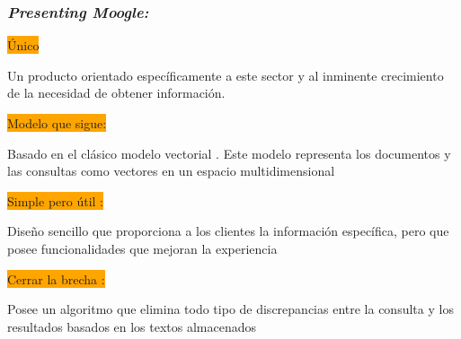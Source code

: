\begin{frame}
    
    \frametitle{\emph{Presenting Moogle:}}

    \colorbox{orange}{\color{black}\Large{Único}}
    \begin{beamerboxesrounded}{}
    Un producto orientado específicamente a este sector y al inminente crecimiento de la necesidad de obtener información.
    
    \end{beamerboxesrounded}
    
    \colorbox{orange}{\Large{\color{black}Modelo que sigue:}}
    \begin{beamerboxesrounded}{}
        Basado en el clásico modelo vectorial . Este modelo representa los documentos y las consultas como vectores en un espacio multidimensional
        
        \end{beamerboxesrounded}
    
    \colorbox{orange}{\Large{\color{black}Simple pero útil :}}
\begin{beamerboxesrounded}{}
    Diseño sencillo que proporciona a los clientes la información específica, pero que posee funcionalidades que mejoran la experiencia

\end{beamerboxesrounded}

\colorbox{orange}{\Large{\color{black}Cerrar la brecha :}}

\begin{beamerboxesrounded}{}
    Posee un algoritmo que elimina todo tipo de discrepancias entre la consulta y los resultados basados en los textos almacenados

\end{beamerboxesrounded}
\end{frame}